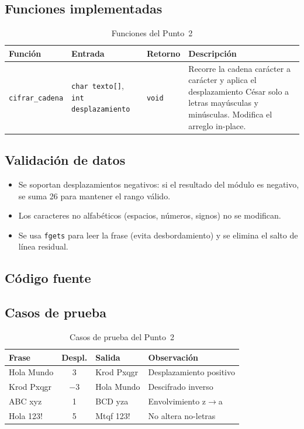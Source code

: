 \documentclass[12pt, letterpaper]{article}
\begin{document}
\subsection{Funciones implementadas}

\begin{table}[H]
\centering
\begin{tabular}{|l|p{4cm}|l|p{5cm}|}
\hline
\textbf{Función} & \textbf{Entrada} & \textbf{Retorno} & \textbf{Descripción} \\
\hline
\texttt{cifrar\_cadena} &
\texttt{char texto[]},
\texttt{int desplazamiento} &
\texttt{void} &
Recorre la cadena carácter a carácter y aplica el desplazamiento César
solo a letras mayúsculas y minúsculas. Modifica el arreglo in-place. \\
\hline
\end{tabular}
\caption{Funciones del Punto~2}
\end{table}

\subsection{Validación de datos}

\begin{itemize}
    \item Se soportan desplazamientos negativos: si el resultado del módulo
          es negativo, se suma 26 para mantener el rango válido.
    \item Los caracteres no alfabéticos (espacios, números, signos) no se
          modifican.
    \item Se usa \texttt{fgets} para leer la frase (evita desbordamiento) y
          se elimina el salto de línea residual.
\end{itemize}

\subsection{Código fuente}



\subsection{Casos de prueba}

\begin{table}[H]
\centering
\begin{tabular}{|l|c|l|l|}
\hline
\textbf{Frase} & \textbf{Despl.} & \textbf{Salida} & \textbf{Observación} \\
\hline
Hola Mundo & 3 & Krod Pxqgr & Desplazamiento positivo \\
\hline
Krod Pxqgr & $-3$ & Hola Mundo & Descifrado inverso \\
\hline
ABC xyz & 1 & BCD yza & Envolvimiento z$\to$a \\
\hline
Hola 123! & 5 & Mtqf 123! & No altera no-letras \\
\hline
\end{tabular}
\caption{Casos de prueba del Punto~2}
\end{table}
\end{document}
